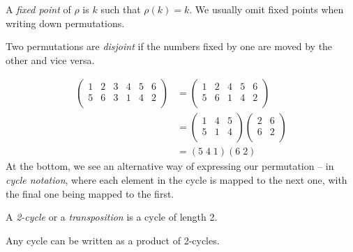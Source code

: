 \documentclass{../template/note}
\begin{document}
    \begin{definition}
        A \emph{fixed point} of \(\rho\) is \(k\) such that \(\rho(k) = k\). We usually omit fixed points when writing down permutations.
    \end{definition}
    
    \begin{definition}
        Two permutations are \emph{disjoint} if the numbers fixed by one are moved by the other and vice versa.
    \end{definition}
    
    \begin{example}
        \begin{align*}
            \begin{pmatrix}
             1 & 2 & 3 & 4 & 5 & 6 \\
             5 & 6 & 3 & 1 & 4 & 2\\
            \end{pmatrix} &= 
            \begin{pmatrix}
             1 & 2 & 4 & 5 & 6 \\
             5 & 6 & 1 & 4 & 2\\
            \end{pmatrix} \\
            &= \begin{pmatrix}
             1 & 4 & 5 \\
             5 & 1 & 4 \\
            \end{pmatrix} \begin{pmatrix}
             2 & 6 \\
             6 & 2 \\
            \end{pmatrix} \\
            &= (5\;4\;1)(6\;2)
        \end{align*}
        At the bottom, we see an alternative way of expressing our permutation -- in \emph{cycle notation}, where each element in the cycle is mapped to the next one, with the final one being mapped to the first.        
    \end{example}
    
    \begin{definition}
        A \emph{2-cycle} or a \emph{transposition} is a cycle of length 2.
    \end{definition}
    
    \begin{proposition}
        Any cycle can be written as a product of 2-cycles.
    \end{proposition}
    
\end{document}
